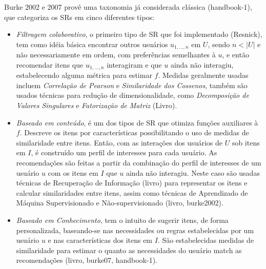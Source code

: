 \documentclass[normaltoc, espacoumemeio, pnumromarab,ruledheader]{abnt}
\begin{document}
Burke 2002 e 2007 provê uma taxonomia já considerada clássica (handbook-1), que categoriza os SRs em cinco diferentes tipos:
\begin{itemize}
 \item \textit{Filtragem colaborativo}, o primeiro tipo de SR que foi implementado (Resnick), tem como idéia básica encontrar outros usuários $u_{1,\dots,n}$ em $U$, sendo $n < |U|$ e não necessariamente em ordem, com preferências semelhantes à $u$, e então recomendar itens que $u_{1,\dots,n}$ interagiram e que $u$ ainda não interagiu, estabelecendo alguma métrica para estimar $f$. Medidas geralmente usadas incluem \textit{Correlação de Pearson} e \textit{Similaridade dos Cossenos}, também são usados técnicas para redução de dimensionalidade, como \textit{Decomposição de Valores Singulares} e \textit{Fatorização de Matriz} (Livro).
 \item \textit{Baseado em conteúdo}, é um dos tipos de SR que otimiza funções auxiliares à $f$. Descreve os itens por características possibilitando o uso de medidas de similaridade entre itens. Então, com as interações dos usuários de $U$ sob itens em $I$, é construído um perfil de interesses para cada usuário. As recomendações são feitas a partir da combinação do perfil de interesses de um usuário $u$ com os itens em $I$ que $u$ ainda não interagiu. Neste caso são usadas técnicas de Recuperação de Informação (livro) para representar os itens e calcular similaridades entre itens, assim como técnicas de Aprendizado de Máquina Supervisionado e Não-supervisionado (livro, burke2002).
 \item \textit{Baseado em Conhecimento}, tem o intuito de sugerir itens, de forma personalizada, baseando-se nas necessidades ou regras estabelecidas por um usuário $u$ e nas características dos itens em $I$. São estabelecidas medidas de similaridade para estimar o quanto as necessidades do usuário match as recomendações (livro, burke07, handbook-1).

\end{itemize}
\end{document}

